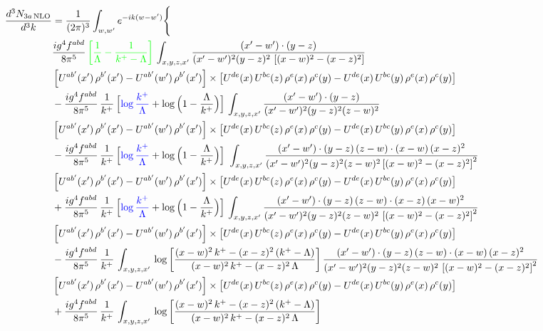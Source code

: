 \documentclass[9pt]{article}
\numberwithin{equation}{section}
\begin{document}
\begin{align}
\frac{d^{3}N_{3a\,\rm NLO}}{d^{3}k} & =\frac{1}{(2\pi)^{3}}\int_{w,w'}e^{-ik(w-w')}\Bigg\{\notag \\ & \frac{ig^{4}f^{abd}}{8\pi^{5}}\,{\color{green}\left[\frac{1}{\Lambda}-\frac{1}{k^{+}-\Lambda}\right]}\,\int_{x,y,z,x'}
\frac{(x'-w')\cdot(y-z)}{(x'-w')^{2}(y-z)^{2}\,\left[(x-w)^{2}-(x-z)^{2}\right]}\notag \\ & \left[U^{ab'}(x')\,\rho^{b'}(x')-U^{ab'}(w')\, \rho^{b'}(x')\right]\times \left[U^{de}(x)\,U^{bc}(z)\, \rho^{e}(x)\,\rho^{c}(y)-U^{de}(x)\,U^{bc}(y)\,\rho^{e}(x)\,\rho^{c}(y)\right]\notag \\ & -\frac{ig^{4}f^{abd}}{8\pi^{5}}\,\frac{1}{k^{+}}\,\Big[{\color{blue}\log\frac{k^{+}}{\Lambda}}+\log\Big(1-\frac{\Lambda}{k^{+}}\Big)\Big]\,\int_{x,y,z,x'}
\frac{(x'-w')\cdot(y-z)}{(x'-w')^{2}(y-z)^{2}(z-w)^{2}}\notag \\ & \left[U^{ab'}(x')\,\rho^{b'}(x')-U^{ab'}(w')\, \rho^{b'}(x')\right]\times \left[U^{de}(x)\,U^{bc}(z)\, \rho^{e}(x)\,\rho^{c}(y)-U^{de}(x)\,U^{bc}(y)\,\rho^{e}(x)\,\rho^{c}(y)\right]\notag \\ & -\frac{ig^{4}f^{abd}}{8\pi^{5}}\,\frac{1}{k^{+}}\,\Big[{\color{blue}\log\frac{k^{+}}{\Lambda}}+\log\Big(1-\frac{\Lambda}{k^{+}}\Big)\Big]\,\,\int_{x,y,z,x'}
\frac{(x'-w')\cdot(y-z)\,(z-w)\cdot(x-w)\,(x-z)^{2}}{(x'-w')^{2}(y-z)^{2}(z-w)^{2}\left[(x-w)^{2}-(x-z)^{2}\right]^{2}}\notag \\ & \left[U^{ab'}(x')\,\rho^{b'}(x')-U^{ab'}(w')\, \rho^{b'}(x')\right]\times \left[U^{de}(x)\,U^{bc}(z)\, \rho^{e}(x)\,\rho^{c}(y)-U^{de}(x)\,U^{bc}(y)\,\rho^{e}(x)\,\rho^{c}(y)\right]\notag \\ & +\frac{ig^{4}f^{abd}}{8\pi^{5}}\,\frac{1}{k^{+}}\,\Big[{\color{blue}\log\frac{k^{+}}{\Lambda}}+\log\Big(1-\frac{\Lambda}{k^{+}}\Big)\Big]\,\int_{x,y,z,x'}
\frac{(x'-w')\cdot(y-z)\,(z-w)\cdot(x-z)\,(x-w)^{2}}{(x'-w')^{2}(y-z)^{2}(z-w)^{2}\,\left[(x-w)^{2}-(x-z)^{2}\right]^{2}}\notag \\ & \left[U^{ab'}(x')\,\rho^{b'}(x')-U^{ab'}(w')\, \rho^{b'}(x')\right]\times \left[U^{de}(x)\,U^{bc}(z)\, \rho^{e}(x)\,\rho^{c}(y)-U^{de}(x)\,U^{bc}(y)\,\rho^{e}(x)\,\rho^{c}(y)\right]\notag \\ & 
-\frac{ig^{4}f^{abd}}{8\pi^{5}}\,\frac{1}{k^{+}}\,\int_{x,y,z,x'}\,\log{\left[\frac{(x-w)^{2}\,k^{+}-(x-z)^{2}\,(k^{+}-\Lambda)}{(x-w)^{2}\,k^{+}-(x-z)^{2}\,\Lambda}\right]}\,
\frac{(x'-w')\cdot(y-z)\,(z-w)\cdot(x-w)\,(x-z)^{2}}{(x'-w')^{2}(y-z)^{2}(z-w)^{2}\,\left[(x-w)^{2}-(x-z)^{2}\right]^{2}}\notag \\ & \left[U^{ab'}(x')\,\rho^{b'}(x')-U^{ab'}(w')\, \rho^{b'}(x')\right]\times \left[U^{de}(x)\,U^{bc}(z)\, \rho^{e}(x)\,\rho^{c}(y)-U^{de}(x)\,U^{bc}(y)\,\rho^{e}(x)\,\rho^{c}(y)\right]\notag \\ & +\frac{ig^{4}f^{abd}}{8\pi^{5}}\,\frac{1}{k^{+}}\,\int_{x,y,z,x'}\,\log{\left[\frac{(x-w)^{2}\,k^{+}-(x-z)^{2}\,(k^{+}-\Lambda)}{(x-w)^{2}\,k^{+}-(x-z)^{2}\,\Lambda}\right]}\,

\end{align}
\end{document}
